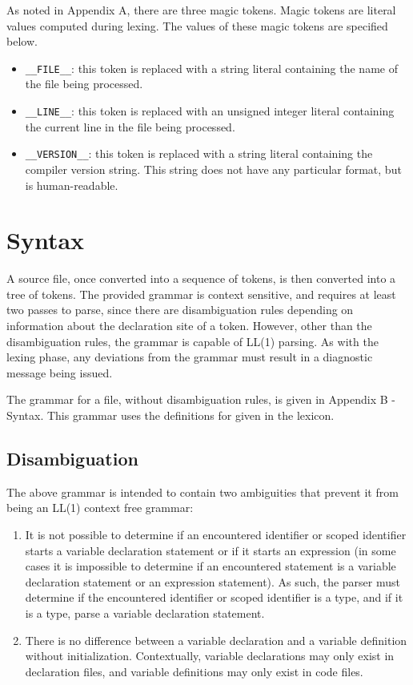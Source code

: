 \documentclass[letterpaper,12pt]{book}
\begin{document}
As noted in Appendix A, there are three magic tokens. Magic tokens are literal values computed during lexing. The values of these magic tokens are specified below.

\begin{itemize}
	\item \texttt{\_\_FILE\_\_}: this token is replaced with a string literal containing the name of the file being processed.
	
	\item \texttt{\_\_LINE\_\_}: this token is replaced with an unsigned integer literal containing the current line in the file being processed.
	
	\item \texttt{\_\_VERSION\_\_}: this token is replaced with a string literal containing the compiler version string. This string does not have any particular format, but is human-readable.
\end{itemize}

\chapter{Syntax}

A source file, once converted into a sequence of tokens, is then converted into a tree of tokens. The provided grammar is context sensitive, and requires at least two passes to parse, since there are disambiguation rules depending on information about the declaration site of a token. However, other than the disambiguation rules, the grammar is capable of LL(1) parsing. As with the lexing phase, any deviations from the grammar must result in a diagnostic message being issued.

The grammar for a file, without disambiguation rules, is given in Appendix B - Syntax. This grammar uses the definitions for given in the lexicon.

\section{Disambiguation}

The above grammar is intended to contain two ambiguities that prevent it from being an LL(1) context free grammar:

\begin{enumerate}

	\item It is not possible to determine if an encountered identifier or scoped identifier starts a variable declaration statement or if it starts an expression (in some cases it is impossible to determine if an encountered statement is a variable declaration statement or an expression statement). As such, the parser must determine if the encountered identifier or scoped identifier is a type, and if it is a type, parse a variable declaration statement.
	
	\item There is no difference between a variable declaration and a variable definition without initialization. Contextually, variable declarations may only exist in declaration files, and variable definitions may only exist in code files.
\end{enumerate}
\end{document}
